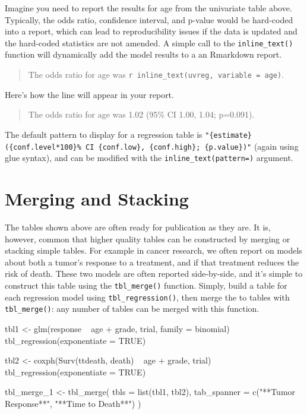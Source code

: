Imagine you need to report the results for age from the univariate table above.
Typically, the odds ratio, confidence interval, and p-value would be hard-coded into a report, which can lead to reproducibility issues if the data is updated and the hard-coded statistics are not amended.
A simple call to the \texttt{inline\_text()} function will dynamically add the model results to a an Rmarkdown report.

\begin{quote}
The odds ratio for age was \texttt{\textasciigrave{}r\ inline\_text(uvreg,\ variable\ =\ age)\textasciigrave{}}.
\end{quote}

Here's how the line will appear in your report.

\begin{quote}
The odds ratio for age was 1.02 (95\% CI 1.00, 1.04; p=0.091).
\end{quote}

The default pattern to display for a regression table is \texttt{"\{estimate\} (\{conf.level*100\}\% CI \{conf.low\}, \{conf.high\}; \{p.value\})"} (again using glue syntax), and can be modified with the \texttt{inline\_text(pattern=)} argument. 

\section{Merging and Stacking}

The  tables shown above are often ready for publication as they are.
It is, however, common that higher quality tables can be constructed by merging or stacking simple tables.
For example in cancer research, we often report on models about both a tumor's response to a treatment, and if that treatment reduces the risk of death.
These two models are often reported side-by-side, and it's simple to construct this table using  the \texttt{tbl\_merge()} function.
Simply, build a table for each regression model using \texttt{tbl\_regression()}, then merge the to tables with \texttt{tbl\_merge()}: any number of  tables can be merged with this function.

\begin{example}
tbl1 <- 
  glm(response ~ age + grade, trial, family = binomial) %
  tbl_regression(exponentiate = TRUE)

tbl2 <-
  coxph(Surv(ttdeath, death) ~ age + grade, trial) %
  tbl_regression(exponentiate = TRUE) 

tbl_merge_1 <-
  tbl_merge(
    tbls = list(tbl1, tbl2),
    tab_spanner = c("**Tumor Response**", "**Time to Death**")
  )
\end{example}

